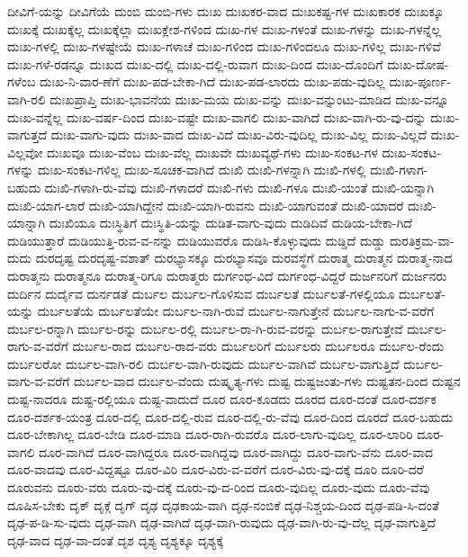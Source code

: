 {ದೀವಿಗೆ-ಯನ್ನು
ದೀವಿಗೆಯೆ
ದುಂಬಿ
ದುಂಬಿ-ಗಳು
ದುಃಖ
ದುಃಖಕರ-ವಾದ
ದುಃಖಕಷ್ಟ-ಗಳ
ದುಃಖಕಾರಕ
ದುಃಖಕ್ಕೂ
ದುಃಖಕ್ಕೆ
ದುಃಖಕ್ಕೆಲ್ಲ
ದುಃಖಕ್ಕೆಲ್ಲಾ
ದುಃಖಕ್ಲೇಶ-ಗಳಿಂದ
ದುಃಖ-ಗಳ
ದುಃಖ-ಗಳಂತೆ
ದುಃಖ-ಗಳನ್ನು
ದುಃಖ-ಗಳನ್ನೆಲ್ಲ
ದುಃಖ-ಗಳಲ್ಲಿ
ದುಃಖ-ಗಳಷ್ಟೇಯೆ
ದುಃಖ-ಗಳಾಚೆ
ದುಃಖ-ಗಳಿಂದ
ದುಃಖ-ಗಳಿಂದಲೂ
ದುಃಖ-ಗಳಿಲ್ಲ
ದುಃಖ-ಗಳಿವೆ
ದುಃಖ-ಗಳೆ-ರಡನ್ನೂ
ದುಃಖದ
ದುಃಖ-ದಲ್ಲಿ
ದುಃಖ-ದಲ್ಲಿ-ರುವಾಗ
ದುಃಖ-ದಿಂದ
ದುಃಖ-ದೊಂದಿಗೆ
ದುಃಖ-ದೋಷ-ಗಳೆಂಬ
ದುಃಖ-ನಿ-ವಾರ-ಣೆಗೆ
ದುಃಖ-ಪಡ-ಬೇಕಾ-ಗಿದೆ
ದುಃಖ-ಪಡ-ಲಾರದು
ದುಃಖ-ಪಡು-ವುದಿಲ್ಲ
ದುಃಖ-ಪೂರ್ಣ-ವಾಗಿ-ರಲಿ
ದುಃಖಪ್ರಾಪ್ತಿ
ದುಃಖ-ಭಾವನೆಯ
ದುಃಖ-ಮಯ
ದುಃಖ-ವನ್ನು
ದುಃಖ-ವನ್ನುಂಟು-ಮಾಡಿದ
ದುಃಖ-ವನ್ನೂ
ದುಃಖ-ವನ್ನೆಲ್ಲ
ದುಃಖ-ವರ್ಷ-ದಿಂದ
ದುಃಖ-ವಷ್ಟೇ
ದುಃಖ-ವಾಗಲಿ
ದುಃಖ-ವಾಗಿದೆ
ದುಃಖ-ವಾಗಿ-ರು-ವು-ದನ್ನು
ದುಃಖ-ವಾಗುತ್ತದೆ
ದುಃಖ-ವಾಗು-ವುದು
ದುಃಖ-ವಾದ
ದುಃಖ-ವಿದೆ
ದುಃಖ-ವಿರು-ವುದಿಲ್ಲ
ದುಃಖ-ವಿಲ್ಲ
ದುಃಖ-ವಿಲ್ಲದೆ
ದುಃಖ-ವಿಲ್ಲವೋ
ದುಃಖವೂ
ದುಃಖ-ವೆಂಬ
ದುಃಖ-ವೆಲ್ಲ
ದುಃಖವೇ
ದುಃಖವ್ಯಥೆ-ಗಳು
ದುಃಖ-ಸಂಕಟ-ಗಳ
ದುಃಖ-ಸಂಕಟ-ಗಳನ್ನು
ದುಃಖ-ಸಂಕಟ-ಗಳಿಲ್ಲ
ದುಃಖ-ಸೂಚಕ-ವಾಗಿದೆ
ದುಃಖಿ
ದುಃಖಿ-ಗಳನ್ನಾಗಿ
ದುಃಖಿ-ಗಳಲ್ಲಿ
ದುಃಖಿ-ಗಳಾಗ-ಬಹುದು
ದುಃಖಿ-ಗಳಾಗಿ-ರು-ವೆವು
ದುಃಖಿ-ಗಳಾದರೆ
ದುಃಖಿ-ಗಳು
ದುಃಖಿ-ಗಳೂ
ದುಃಖಿ-ಯಂತೆ
ದುಃಖಿ-ಯನ್ನಾಗಿ
ದುಃಖಿ-ಯಾಗ-ಲಾರೆ
ದುಃಖಿ-ಯಾಗಿದ್ದೇನೆ
ದುಃಖಿ-ಯಾಗಿ-ರುವನು
ದುಃಖಿ-ಯಾಗುವಂತೆ
ದುಃಖಿ-ಯಾದರೆ
ದುಃಖಿ-ಯಾನ್ನಾಗಿ
ದುಃಖಿಯೂ
ದುಃಸ್ಥಿತಿಗೆ
ದುಃಸ್ಥಿತಿ-ಯನ್ನು
ದುಡಿತ-ವಾಗು-ವುದು
ದುಡಿದಿವೆ
ದುಡಿಯ-ಬೇಕಾ-ಗಿದೆ
ದುಡಿಯುತ್ತಾರೆ
ದುಡಿಯುತ್ತಿ-ರುವ-ವ-ನನ್ನು
ದುಡಿಯುವರೊ
ದುಡಿಸಿ-ಕೊಳ್ಳುವುದು
ದುಡ್ಡಿದೆ
ದುಡ್ಡು
ದುರತಿಕ್ರಮ-ವಾ-ದುದು
ದುರದೃಷ್ಟ
ದುರದೃಷ್ಟ-ವಶಾತ್
ದುರಭ್ಯಾಸಕ್ಕೂ
ದುರಭ್ಯಾಸವೂ
ದುರವಸ್ಥೆಗೆ
ದುರಾತ್ಮ
ದುರಾತ್ಮನ
ದುರಾತ್ಮ-ನಾದ
ದುರಾತ್ಮನು
ದುರಾತ್ಮನೂ
ದುರಾತ್ಮ-ರಿಗೂ
ದುರಾತ್ಮರು
ದುರ್ಗಂಧ-ವಿದೆ
ದುರ್ಗಂಧ-ವಿದ್ದರೆ
ದುರ್ಜನರಿಗೆ
ದುರ್ಜನರು
ದುರ್ದಿನ
ದುರ್ದೈವ
ದುರ್ನಡತೆ
ದುರ್ಬಲ
ದುರ್ಬಲ-ಗೊಳಿಸುವ
ದುರ್ಬಲತೆ
ದುರ್ಬಲತೆ-ಗಳಲ್ಲಿಯೂ
ದುರ್ಬಲತೆ-ಯನ್ನು
ದುರ್ಬಲತೆಯೆ
ದುರ್ಬಲತೆಯೇ
ದುರ್ಬಲ-ನಾಗಿ-ರುವೆ
ದುರ್ಬಲ-ನಾಗುತ್ತೇನೆ
ದುರ್ಬಲ-ನಾಗು-ವ-ವರೆಗೆ
ದುರ್ಬಲ-ರನ್ನಾಗಿ
ದುರ್ಬಲ-ರನ್ನು
ದುರ್ಬಲ-ರಲ್ಲಿ
ದುರ್ಬಲ-ರಾ-ಗಿ-ರುವ-ವರನ್ನು
ದುರ್ಬಲ-ರಾಗುತ್ತೇವೆ
ದುರ್ಬಲ-ರಾಗು-ವ-ವರೆಗೆ
ದುರ್ಬಲ-ರಾದ
ದುರ್ಬಲ-ರಾದ-ವರು
ದುರ್ಬಲರಿಗೆ
ದುರ್ಬಲರು
ದುರ್ಬಲರೂ
ದುರ್ಬಲ-ರೆಂದು
ದುರ್ಬಲರೋ
ದುರ್ಬಲ-ವಾಗಿ-ರಲಿ
ದುರ್ಬಲ-ವಾಗಿ-ರುವುದು
ದುರ್ಬಲ-ವಾಗಿವೆ
ದುರ್ಬಲ-ವಾಗುತ್ತಿದೆ
ದುರ್ಬಲ-ವಾಗು-ವ-ವರೆಗೆ
ದುರ್ಬಲ-ವಾದ
ದುರ್ಬಲ-ವೆಂದು
ದುಷ್ಕೃತ್ಯ-ಗಳು
ದುಷ್ಟ
ದುಷ್ಟಜಂತು-ಗಳು
ದುಷ್ಟತನ-ದಿಂದ
ದುಷ್ಟನ
ದುಷ್ಟ-ನಾದರೂ
ದುಷ್ಟ-ರಲ್ಲಿಯೂ
ದುಷ್ಟ-ವಾದುದೆ
ದೂರ
ದೂರ-ಕೂಡದು
ದೂರದ
ದೂರ-ದಂತೆ
ದೂರ-ದರ್ಶಕ
ದೂರ-ದರ್ಶಕ-ಯಂತ್ರ
ದೂರ-ದಲ್ಲಿ
ದೂರ-ದಲ್ಲಿ-ರುವ
ದೂರ-ದಲ್ಲಿ-ರು-ವೆವು
ದೂರ-ದಿಂದ
ದೂರದೆ
ದೂರ-ಬಹುದು
ದೂರ-ಬೇಕಾಗಿಲ್ಲ
ದೂರ-ಬೇಡಿ
ದೂರ-ಮಾಡಿ
ದೂರ-ರಾಗಿ-ರುವರೊ
ದೂರ-ಲಾಗು-ವುದಿಲ್ಲ
ದೂರ-ಲಾರಿರಿ
ದೂರ-ವಾಗಲಿ
ದೂರ-ವಾಗಿದೆ
ದೂರ-ವಾಗಿದ್ದರೂ
ದೂರ-ವಾಗಿದ್ದವು
ದೂರ-ವಾಗಿದ್ದು
ದೂರ-ವಾಗು-ವೆನು
ದೂರ-ವಾದ
ದೂರ-ವಾದವು
ದೂರ-ವಿದ್ದಷ್ಟೂ
ದೂರ-ವಿರಿ
ದೂರ-ವಿರು-ವ-ವರೆಗೆ
ದೂರ-ವಿರು-ವು-ದಕ್ಕೆ
ದೂರಿ
ದೂರಿ-ದರೆ
ದೂರುವನು
ದೂರು-ವರು
ದೂರು-ವು-ದಕ್ಕೆ
ದೂರು-ವು-ದ-ರಿಂದ
ದೂರು-ವುದಿಲ್ಲ
ದೂರು-ವುದು
ದೂರು-ವೆವು
ದೂಷಿಸ-ಬೇಕು
ದೃಕ್
ದೃಕ್ಗೆ
ದೃಗ್
ದೃಢ
ದೃಢಕಾಯ-ವಾಗಿ
ದೃಢ-ನಂಬಿಕೆ
ದೃಢ-ನಿಶ್ಚಯ-ದಿಂದ
ದೃಢ-ಪಡಿ-ಸಿ-ದಂತೆ
ದೃಢ-ಪ-ಡಿ-ಸು-ವುದು
ದೃಢ-ವಾಗಿ
ದೃಢ-ವಾಗಿದೆ
ದೃಢ-ವಾಗಿ-ರುವುದು
ದೃಢ-ವಾಗಿ-ರು-ವು-ದೆಲ್ಲ
ದೃಢ-ವಾಗುತ್ತಿದೆ
ದೃಢ-ವಾದ
ದೃಢ-ವಾ-ದಂತೆ
ದೃಶ
ದೃಶ್ಯ
ದೃಶ್ಯಕ್ಕೂ
ದೃಶ್ಯಕ್ಕೆ
}
